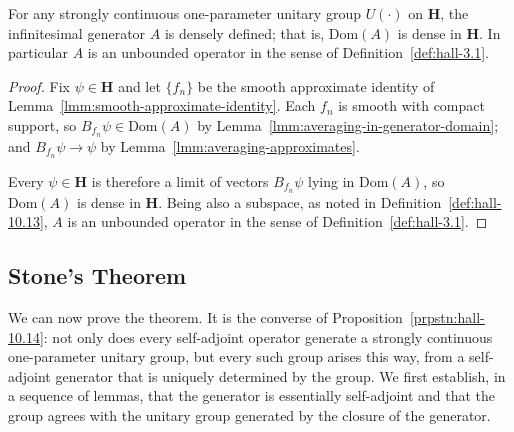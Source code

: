 \begin{lemma}
    \label{lmm:hall-10.18}
    \leanok
    For any strongly continuous one-parameter unitary group $U(\cdot)$ on $\mathbf{H}$, the infinitesimal generator $A$ is densely defined; that is, $\text{Dom}(A)$ is dense in $\mathbf{H}$. In particular $A$ is an unbounded operator in the sense of Definition~\ref{def:hall-3.1}.
\end{lemma}
\begin{proof}
    \leanok
Fix $\psi \in \mathbf{H}$ and let $\{f_n\}$ be the smooth approximate identity of Lemma~\ref{lmm:smooth-approximate-identity}. Each $f_n$ is smooth with compact support, so $B_{f_n}\psi \in \text{Dom}(A)$ by Lemma~\ref{lmm:averaging-in-generator-domain}; and $B_{f_n}\psi \to \psi$ by Lemma~\ref{lmm:averaging-approximates}.

Every $\psi \in \mathbf{H}$ is therefore a limit of vectors $B_{f_n}\psi$ lying in $\text{Dom}(A)$, so $\text{Dom}(A)$ is dense in $\mathbf{H}$. Being also a subspace, as noted in Definition~\ref{def:hall-10.13}, $A$ is an unbounded operator in the sense of Definition~\ref{def:hall-3.1}.
\end{proof}

\subsection{Stone's Theorem}
We can now prove the theorem. It is the converse of Proposition~\ref{prpstn:hall-10.14}: not only does every self-adjoint operator generate a strongly continuous one-parameter unitary group, but every such group arises this way, from a self-adjoint generator that is uniquely determined by the group. We first establish, in a sequence of lemmas, that the generator is essentially self-adjoint and that the group agrees with the unitary group generated by the closure of the generator.

